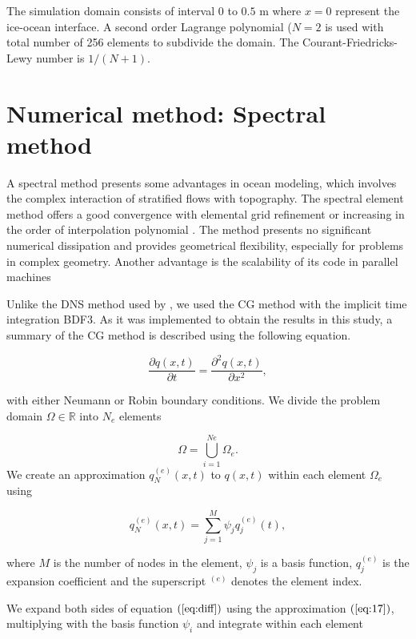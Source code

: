 \documentclass[11pt,a4paper]{article}
\begin{document}
	The simulation domain consists of interval $0$ to $0.5$ m where $x = 0$ represent the ice-ocean interface. A second order Lagrange polynomial ($N=2$ is used with total number of 256 elements to subdivide the domain. The Courant-Friedricks-Lewy number is $1/(N+1)$.
	
	\section{Numerical method: Spectral method}
	
	A spectral method presents some advantages in ocean modeling, which involves the complex interaction of stratified flows with topography. The spectral element method offers a good convergence with elemental grid refinement or increasing in the order of interpolation polynomial \citep{ilicak2009non}. The method presents no significant numerical dissipation and provides geometrical flexibility, especially for problems in complex geometry. Another advantage is the scalability of its code in parallel machines
	
	Unlike the DNS method used by \cite{gayen2016simulation}, we used the CG method with the implicit time integration BDF3. As it was implemented to obtain the results in this study, a summary of the CG method is described using the following equation.
	
	\begin{equation}
	\label{eq:diff}
	    \dfrac{\partial q(x,t)}{\partial t} = \dfrac{\partial^2 q(x,t)}{\partial x^2},
	\end{equation}
	
	\noindent with either Neumann or Robin boundary conditions. We divide the problem domain $\Omega\in\mathbb{R}$ into $N_e$ elements
	
	$$\Omega = \bigcup_{i=1}^{Ne}\Omega_e.$$
	We create an approximation $q_N^{(e)}(x,t)$ to $q(x,t)$ within each element $\Omega_e$ using 
	
	\begin{equation}
	\label{eq:17}
	    q_N^{(e)}(x,t) = \sum_{j=1}^{M} \psi_jq_j^{(e)}(t),
	\end{equation}
	
	where $M$ is the number of nodes in the element, $\psi_j$ is a basis function, $q_j^{(e)}$ is the expansion coefficient and the superscript $^{(e)}$ denotes the element index.
	
	We expand both sides of equation $(\ref{eq:diff})$ using the approximation $(\ref{eq:17})$, multiplying with the basis function $\psi_i$ and integrate within each element 
	
\end{document}
